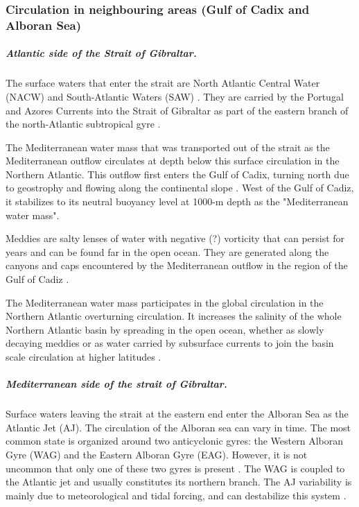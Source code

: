 \subsubsection{Circulation in neighbouring areas (Gulf of Cadix and Alboran Sea)}

\subparagraph{Atlantic side of the Strait of Gibraltar.}

The surface waters that enter the strait are North Atlantic Central Water (NACW) and South-Atlantic Waters (SAW) \citep{millot_2014,naranjo_2015}. They are carried by the Portugal and Azores Currents into the Strait of Gibraltar as part of the eastern branch of the north-Atlantic subtropical gyre \citep{barton_2001}.

The Mediterranean water mass that was transported out of the strait as the Mediterranean outflow circulates at depth below this surface circulation in the Northern Atlantic. This outflow first enters the Gulf of Cadix, turning north due to geostrophy and flowing along the continental slope \citep{price_1993,gasser_2017}. West of the Gulf of Cadiz, it stabilizes to its neutral buoyancy level at 1000-m depth as the "Mediterranean water mass"\citep{price_1993}.

Meddies are salty lenses of water with negative  \color{blue}(?) \color{black} vorticity that can persist for years and can be found far in the open ocean. \color{blue}They \color{black} are generated along the canyons and caps encountered by the Mediterranean outflow in the region of the Gulf of Cadiz \citep{bashmachnikov_2015}. 

The Mediterranean water mass participates in the global circulation in the Northern Atlantic overturning circulation. It increases the salinity of the whole Northern Atlantic basin by spreading in the open ocean, whether as slowly decaying meddies or as water carried by subsurface currents to join the basin scale circulation at higher latitudes \citep{price_1993,jia_2007}.

\subparagraph{Mediterranean side of the strait of Gibraltar.} 

Surface waters leaving the strait at the eastern end enter the Alboran Sea as the Atlantic Jet (AJ). The circulation of the Alboran sea can vary in time. The most common state is organized around two anticyclonic gyres: the Western Alboran Gyre (WAG) and the Eastern Alboran Gyre (EAG). However, it is not uncommon that only one of these two gyres is present \citep{millot_2005}. The WAG is coupled to the Atlantic jet and usually constitutes its northern branch. The AJ variability is mainly due to meteorological and tidal forcing, and can destabilize this system \citep{sanchez-garrido_2013,lorente_2019}.

